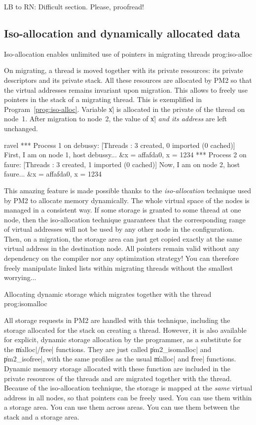 \begin{note}
  LB to RN: Difficult section. Please, proofread!
\end{note}


\subsection{Iso-allocation and dynamically allocated data}

 {Iso-allocation enables unlimited use of
  pointers in migrating threads} {prog:iso-alloc}

On migrating, a thread is moved together with its private resources:
its private descriptors and its private stack. All these resources are
allocated by PM2 so that the virtual addresses remains invariant upon
migration. This allows to freely use pointers in the stack of a
migrating thread. This is exemplified in
Program~\ref{prog:iso-alloc}. Variable \|x| is allocated in the
private of the thread on node~1. After migration to node~2, the value
of \|x| \emph{and its address} are left unchanged.
\begin{shell}
ravel%
*** Process 1 on debussy:
[Threads : 3 created, 0 imported (0 cached)]
First, I am on node 1, host debussy... &x = affafda0, x = 1234
*** Process 2 on faure:
[Threads : 3 created, 1 imported (0 cached)]
Now, I am on node 2, host faure... &x = affafda0, x = 1234
\end{shell}

This amazing feature is made possible thanks to the
\emph{iso-allocation} technique used by PM2 to allocate memory
dynamically. The whole virtual space of the nodes is managed in a
consistent way. If some storage is granted to some thread at one node,
then the iso-allocation technique guarantees that the corresponding
range of virtual addresses will not be used by any other node in the
configuration. Then, on a migration, the storage area can just get
copied exactly at the same virtual address in the destination node.
All pointers remain valid without any dependency on the compiler nor
any optimization strategy! You can therefore freely manipulate linked
lists within migrating threads without the smallest worrying...

 {Allocating dynamic storage which
  migrates together with the thread} {prog:isomalloc}

All storage requests in PM2 are handled with this technique, including
the storage allocated for the stack on creating a thread. However, it
is also available for explicit, dynamic storage allocation by the
programmer, as a substitute for the \|malloc|/\|free| functions. They
are just called \|pm2_isomalloc| and \|pm2_isofree|, with the same
profiles as the usual \|malloc| and \|free| functions. Dynamic memory
storage allocated with these function are included in the private
resources of the threads and are migrated together with the
thread. Because of the iso-allocation technique, the storage is mapped
at the \emph{same} virtual address in all nodes, so that pointers can
be freely used. You can use them within a storage area. You can use
them across areas. You can use them between the stack and a storage
area. 


